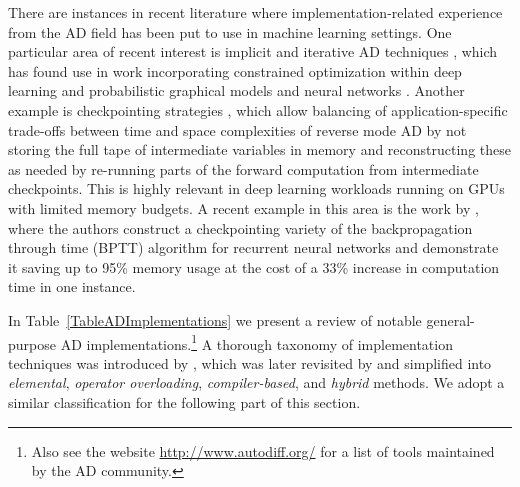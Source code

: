 \documentclass[twoside,11pt]{article}
\begin{document}
There are instances in recent literature where implementation-related experience from the AD field has been put to use in machine learning settings. One particular area of recent interest is implicit and iterative AD techniques \citep{Griewank2008}, which has found use in work incorporating constrained optimization within deep learning \citep{amos2017optnet} and probabilistic graphical models and neural networks \citep{johnson2016composing}. Another example is checkpointing strategies \citep{Dauvergne2006,siskind2017divide}, which allow balancing of application-specific trade-offs between time and space complexities of reverse mode AD by not storing the full tape of intermediate variables in memory and reconstructing these as needed by re-running parts of the forward computation from intermediate checkpoints. This is highly relevant in deep learning workloads running on GPUs with limited memory budgets. A recent example in this area is the work by \citet{gruslys2016memory}, where the authors construct a checkpointing variety of the backpropagation through time (BPTT) algorithm for recurrent neural networks and demonstrate it saving up to 95\% memory usage at the cost of a 33\% increase in computation time in one instance.

In Table~\ref{TableADImplementations} we present a review of notable general-purpose AD implementations.\footnote{Also see the website \url{http://www.autodiff.org/} for a list of tools maintained by the AD community.} A thorough taxonomy of implementation techniques was introduced by \citet{Juedes1991}, which was later revisited by \citet{Bischof2008} and simplified into \emph{elemental}, \emph{operator overloading}, \emph{compiler-based}, and \emph{hybrid} methods. We adopt a similar classification for the following part of this section.

\end{document}
